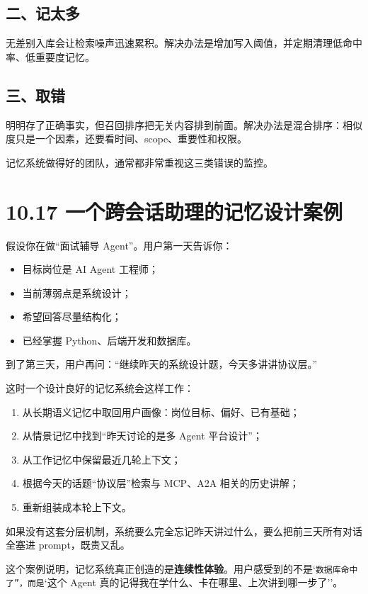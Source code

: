 \subsection{二、记太多}

无差别入库会让检索噪声迅速累积。解决办法是增加写入阈值，并定期清理低命中率、低重要度记忆。


\subsection{三、取错}

明明存了正确事实，但召回排序把无关内容排到前面。解决办法是混合排序：相似度只是一个因素，还要看时间、scope、重要性和权限。


记忆系统做得好的团队，通常都非常重视这三类错误的监控。


\section{10.17 一个跨会话助理的记忆设计案例}

假设你在做``面试辅导 Agent''。用户第一天告诉你：


\begin{itemize}[leftmargin=2em]
\item 目标岗位是 AI Agent 工程师；
\item 当前薄弱点是系统设计；
\item 希望回答尽量结构化；
\item 已经掌握 Python、后端开发和数据库。
\end{itemize}

到了第三天，用户再问：``继续昨天的系统设计题，今天多讲讲协议层。''

这时一个设计良好的记忆系统会这样工作：


\begin{enumerate}[leftmargin=2em]
\item 从长期语义记忆中取回用户画像：岗位目标、偏好、已有基础；
\item 从情景记忆中找到``昨天讨论的是多 Agent 平台设计''；
\item 从工作记忆中保留最近几轮上下文；
\item 根据今天的话题``协议层''检索与 MCP、A2A 相关的历史讲解；
\item 重新组装成本轮上下文。
\end{enumerate}

如果没有这套分层机制，系统要么完全忘记昨天讲过什么，要么把前三天所有对话全塞进 prompt，既贵又乱。


这个案例说明，记忆系统真正创造的是\textbf{连续性体验}。用户感受到的不是`\texttt{数据库命中了''，而是}`这个 Agent 真的记得我在学什么、卡在哪里、上次讲到哪一步了''。


